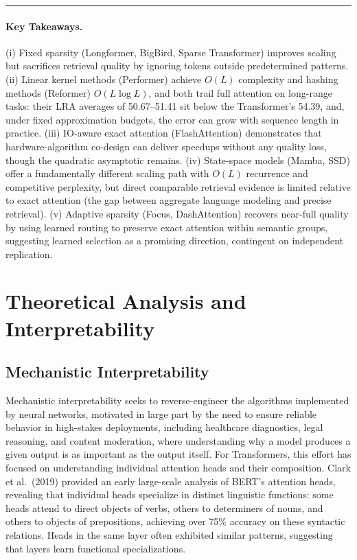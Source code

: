 \documentclass[10pt,twocolumn]{article}
\begin{document}
\begin{center}\rule{0.5\linewidth}{0.5pt}\end{center}
\paragraph{Key Takeaways.} (i) Fixed sparsity (Longformer, BigBird, Sparse Transformer) improves scaling but sacrifices retrieval quality by ignoring tokens outside predetermined patterns. (ii) Linear kernel methods (Performer) achieve $O(L)$ complexity and hashing methods (Reformer) $O(L \log L)$, and both trail full attention on long-range tasks: their LRA averages of 50.67--51.41 sit below the Transformer's 54.39, and, under fixed approximation budgets, the error can grow with sequence length in practice. (iii) IO-aware exact attention (FlashAttention) demonstrates that hardware-algorithm co-design can deliver speedups without any quality loss, though the quadratic asymptotic remains. (iv) State-space models (Mamba, SSD) offer a fundamentally different scaling path with $O(L)$ recurrence and competitive perplexity, but direct comparable retrieval evidence is limited relative to exact attention (the gap between aggregate language modeling and precise retrieval). (v) Adaptive sparsity (Focus, DashAttention) recovers near-full quality by using learned routing to preserve exact attention within semantic groups, suggesting learned selection as a promising direction, contingent on independent replication.

\section{Theoretical Analysis and Interpretability}\label{theoretical-analysis-and-interpretability}

\subsection{Mechanistic Interpretability}\label{mechanistic-interpretability}

Mechanistic interpretability seeks to reverse-engineer the algorithms implemented by neural networks, motivated in large part by the need to ensure reliable behavior in high-stakes deployments, including healthcare diagnostics, legal reasoning, and content moderation, where understanding why a model produces a given output is as important as the output itself. For Transformers, this effort has focused on understanding individual attention heads and their composition. Clark et al.~(2019) provided an early large-scale analysis of BERT's attention heads, revealing that individual heads specialize in distinct linguistic functions: some heads attend to direct objects of verbs, others to determiners of nouns, and others to objects of prepositions, achieving over 75\% accuracy on these syntactic relations. Heads in the same layer often exhibited similar patterns, suggesting that layers learn functional specializations.
\end{document}
